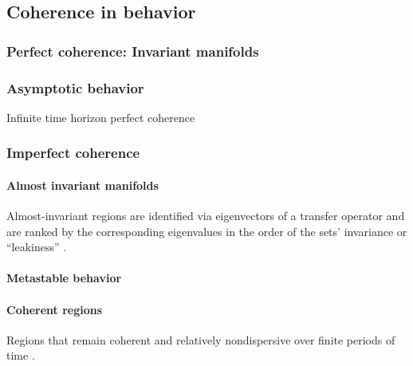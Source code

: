 \documentclass{article}
\theoremstyle{definition} \newtheorem{definition}{Definition}  \newtheorem{example}{Example}
\theoremstyle{remark} \newtheorem{remark}{Remark}
\newcounter{ct}
\begin{document}
\subsection{Coherence in behavior}
\subsubsection{Perfect coherence: Invariant manifolds}%


\subsubsection{Asymptotic behavior}\label{sec:asymptotic}
Infinite time horizon perfect coherence





\subsubsection{Imperfect coherence}%
\paragraph{Almost invariant manifolds}
 Almost-invariant regions are identified via eigenvectors of a transfer operator and are ranked by the corresponding eigenvalues in the order of the sets' invariance or ``leakiness'' \citep{froyland2009almost}.
    
    
    
\paragraph{Metastable behavior}\label{sec:metastable}
   \citep{brinkman2022metastable}
    
    
\paragraph{Coherent regions}
Regions that remain coherent and relatively nondispersive over finite periods of time \citep{fackeldey2019metastable}.



\end{document}
